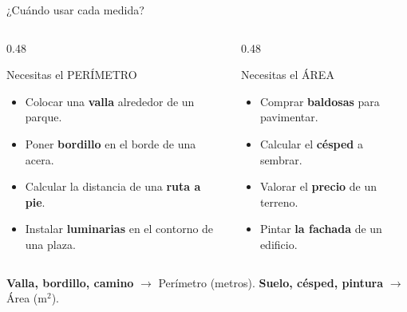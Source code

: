 \documentclass[aspectratio=169, 10pt, spanish]{beamer}
\begin{document}
\begin{frame}{¿Cuándo usar cada medida?}
  \begin{columns}[t]
    \begin{column}{0.48\textwidth}
      \begin{definicionbox}{Necesitas el PERÍMETRO}
        \AlmFontSmall
        \begin{itemize}
          \item Colocar una \textbf{valla} alrededor de un parque.
          \item Poner \textbf{bordillo} en el borde de una acera.
          \item Calcular la distancia de una \textbf{ruta a pie}.
          \item Instalar \textbf{luminarias} en el contorno de una plaza.
        \end{itemize}
      \end{definicionbox}
    \end{column}
    \begin{column}{0.48\textwidth}
      \begin{definicionbox}{Necesitas el ÁREA}
        \AlmFontSmall
        \begin{itemize}
          \item Comprar \textbf{baldosas} para pavimentar.
          \item Calcular el \textbf{césped} a sembrar.
          \item Valorar el \textbf{precio} de un terreno.
          \item Pintar \textbf{la fachada} de un edificio.
        \end{itemize}
      \end{definicionbox}
    \end{column}
  \end{columns}
  \vspace{0.3cm}
  \begin{notabox}[Resumen]
    \AlmFontSmall \textbf{Valla, bordillo, camino} $\rightarrow$ Perímetro (metros).
    \quad
    \textbf{Suelo, césped, pintura} $\rightarrow$ Área (m$^2$).
  \end{notabox}
\end{frame}

\end{document}
